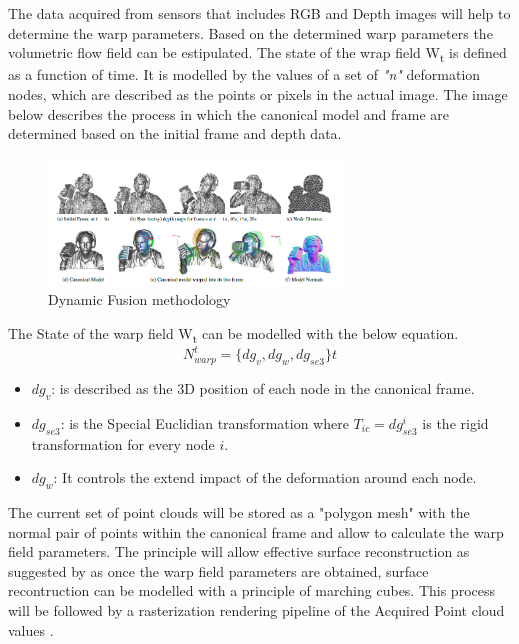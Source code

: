 \documentclass[12pt]{report}
\begin{document}
The data acquired from sensors that includes RGB and Depth images will help to determine the warp parameters. Based on the determined warp parameters the volumetric flow field can be estipulated.
The state of the wrap field W\textsubscript{t} is defined as a function of time. It is modelled by the values of a set of \textit{"n"} deformation nodes, which are described as the points or pixels in the actual image.
The image below describes the process in which the canonical model and frame are determined based on the initial frame and depth data. 
\begin{figure}{}%
    \centering
    \includegraphics[width=0.7\textwidth]{dynamicfusion2.png}
   \caption{Dynamic Fusion methodology \cite[]{newcombe_fox_seitz_2015}}
\end{figure}


The State of the warp field W\textsubscript{t} can be modelled with the below equation.
\[N_{warp}^t=\{dg_v,dg_w,dg_{se3}\}t\]
\begin{itemize}[label =]
    \item $dg_{v}$: is described as the 3D position of each node in the canonical frame. 
    \item $dg_{se3}$: is the Special Euclidian transformation where $T_{ic}=dg_{se3} ^ {i}$ is the rigid transformation for every node $i$.
    \item $dg_{w}$: It controls the extend impact of the deformation around each node.
\end{itemize}

The current set of point clouds will be stored  as a "polygon mesh" with the normal pair of points within the canonical frame and allow to calculate the warp field parameters. 
The principle will allow effective surface reconstruction as suggested by  as once the warp field parameters are obtained, surface recontruction can be modelled with a principle of marching cubes.
This process will be followed by a rasterization rendering pipeline of the Acquired Point cloud values .
\end{document}

